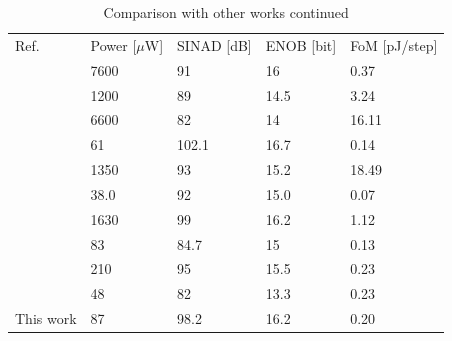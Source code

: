 \begin{table}[H]
\centering

\caption{Comparison with other works continued}
\label{comparsion_works_2}
\begin{tabular}{l|l|l|l|l}
\hline
\multirow{1}{*}{Ref.} & \multicolumn{1}{c|}{Power [$\mu$W]} & \multicolumn{1}{c|}{SINAD [dB]} & \multicolumn{1}{c|}{ENOB [bit]} & \multicolumn{1}{c}{FoM [pJ/step]}\\\cline{1-5}

        \cite{ref_1} & 7600 & 91 & 16 & 0.37\\
        \cite{ref_2} &  1200 & 89 & 14.5 & 3.24\\
        \cite{ref_3} & 6600 & 82 & 14 & 16.11\\
        \cite{SQNR} & 61 & 102.1 & 16.7 & 0.14\\
        \cite{ref_4} & 1350 & 93 & 15.2 & 18.49 \\
        \cite{ref_5} & 38.0 & 92 & 15.0 & 0.07 \\
        \cite{ref_6} & 1630 & 99 & 16.2 & 1.12\\
        \cite{ref_7} & 83 & 84.7 & 15 & 0.13\\
        \cite{ref_8} & 210 & 95 & 15.5 & 0.23\\
        \cite{ref_9} & 48 & 82 & 13.3 & 0.23\\
        This work & 87 & 98.2 & 16.2 & 0.20\\
\hline            
\end{tabular}
\end{table}